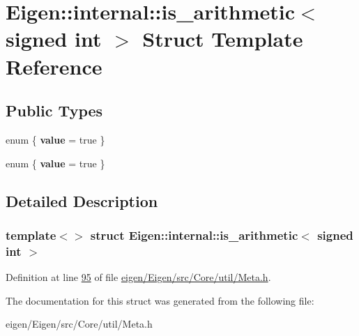 \hypertarget{struct_eigen_1_1internal_1_1is__arithmetic_3_01signed_01int_01_4}{}\section{Eigen\+:\+:internal\+:\+:is\+\_\+arithmetic$<$ signed int $>$ Struct Template Reference}
\label{struct_eigen_1_1internal_1_1is__arithmetic_3_01signed_01int_01_4}
\subsection*{Public Types}
\begin{DoxyCompactItemize}
\item 
\mbox{\label{struct_eigen_1_1internal_1_1is__arithmetic_3_01signed_01int_01_4_a116b5db5c458adc11c75adf9630f3b29}} 
enum \{ {\bfseries value} = true
 \}
\item 
\mbox{\label{struct_eigen_1_1internal_1_1is__arithmetic_3_01signed_01int_01_4_a5bf814c2ec7dfe20cb8b1113219b318b}} 
enum \{ {\bfseries value} = true
 \}
\end{DoxyCompactItemize}


\subsection{Detailed Description}
\subsubsection*{template$<$$>$\newline
struct Eigen\+::internal\+::is\+\_\+arithmetic$<$ signed int $>$}



Definition at line \hyperlink{eigen_2_eigen_2src_2_core_2util_2_meta_8h_source_l00095}{95} of file \hyperlink{eigen_2_eigen_2src_2_core_2util_2_meta_8h_source}{eigen/\+Eigen/src/\+Core/util/\+Meta.\+h}.



The documentation for this struct was generated from the following file\+:\begin{DoxyCompactItemize}
\item 
eigen/\+Eigen/src/\+Core/util/\+Meta.\+h\end{DoxyCompactItemize}
